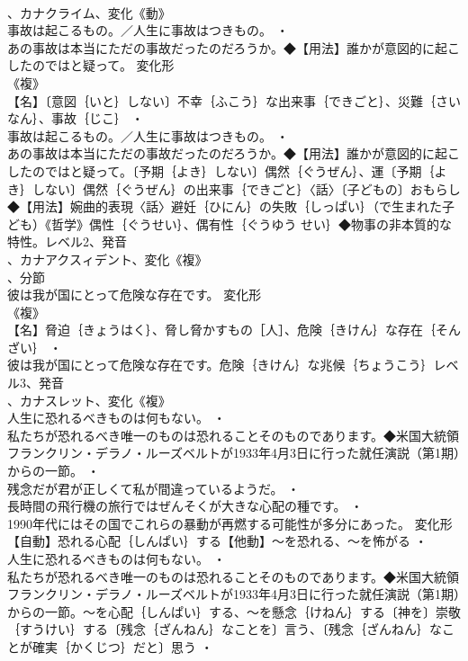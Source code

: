 \documentclass[8pt]{extreport}
\begin{document}
\begin{CJK}{UTF8}{min}
\\	、カナクライム、変化《動》
\\	事故は起こるもの。／人生に事故はつきもの。 ・
\\	あの事故は本当にただの事故だったのだろうか。◆【用法】誰かが意図的に起こしたのではと疑って。	変化形 
\\	《複》
\\	【名】〔意図｛いと｝しない〕不幸｛ふこう｝な出来事｛できごと｝、災難｛さいなん｝、事故｛じこ｝ ・
\\	事故は起こるもの。／人生に事故はつきもの。 ・
\\	あの事故は本当にただの事故だったのだろうか。◆【用法】誰かが意図的に起こしたのではと疑って。〔予期｛よき｝しない〕偶然｛ぐうぜん｝、運〔予期｛よき｝しない〕偶然｛ぐうぜん｝の出来事｛できごと｝〈話〉〔子どもの〕おもらし◆【用法】婉曲的表現〈話〉避妊｛ひにん｝の失敗｛しっぱい｝（で生まれた子ども）《哲学》偶性｛ぐうせい｝、偶有性｛ぐうゆう せい｝◆物事の非本質的な特性。レベル2、発音
\\	、カナアクスィデント、変化《複》
\\	、分節
\\	彼は我が国にとって危険な存在です。	変化形 
\\	《複》
\\	【名】脅迫｛きょうはく｝、脅し脅かすもの［人］、危険｛きけん｝な存在｛そんざい｝ ・
\\	彼は我が国にとって危険な存在です。危険｛きけん｝な兆候｛ちょうこう｝レベル3、発音
\\	、カナスレット、変化《複》
\\	人生に恐れるべきものは何もない。 ・
\\	私たちが恐れるべき唯一のものは恐れることそのものであります。◆米国大統領フランクリン・デラノ・ルーズベルトが1933年4月3日に行った就任演説（第1期）からの一節。 ・
\\	残念だが君が正しくて私が間違っているようだ。 ・
\\	長時間の飛行機の旅行ではぜんそくが大きな心配の種です。 ・
\\	1990年代にはその国でこれらの暴動が再燃する可能性が多分にあった。	変化形 
\\	【自動】恐れる心配｛しんぱい｝する【他動】～を恐れる、～を怖がる ・
\\	人生に恐れるべきものは何もない。 ・
\\	私たちが恐れるべき唯一のものは恐れることそのものであります。◆米国大統領フランクリン・デラノ・ルーズベルトが1933年4月3日に行った就任演説（第1期）からの一節。～を心配｛しんぱい｝する、～を懸念｛けねん｝する〔神を〕崇敬｛すうけい｝する〔残念｛ざんねん｝なことを〕言う、〔残念｛ざんねん｝なことが確実｛かくじつ｝だと〕思う ・

\end{CJK}
\end{document}
